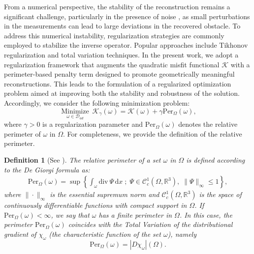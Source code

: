 \documentclass[a4paper,12pt,reqno,natbib]{amsart}
\newtheorem{definition}[theorem]{Definition}
\newcommand{\dx} {\displaystyle\mathrm{d}x}
\begin{document}
From a numerical perspective, the stability of the reconstruction remains a significant challenge, particularly in the presence of noise \cite{hadamard1923lectures}, as small perturbations in the measurements can lead to large deviations in the recovered obstacle. To address this numerical instability, regularization strategies are commonly employed to stabilize the inverse operator. Popular approaches include Tikhonov regularization and total variation techniques. In the present work, we adopt a regularization framework that augments the quadratic misfit functional \( \mathcal{K} \) with a perimeter-based penalty term designed to promote geometrically meaningful reconstructions. This leads to the formulation of a regularized optimization problem aimed at improving both the stability and robustness of the solution. Accordingly, we consider the following minimization problem:
\begin{equation}\label{regularization-topopt-problem}
    \displaystyle\operatorname*{Minimize}_{\omega\in\mathcal{D}_{ad}}\
\mathcal{K}_\gamma(\omega) = \mathcal{K}(\omega)+\gamma\text{Per}_\Omega(\omega),
\end{equation}
where $\gamma>0$ is a regularization parameter and $\text{Per}_\Omega(\omega)$ denotes the relative perimeter of $\omega$ in $\Omega.$ For completeness, we provide the definition of the relative perimeter.




\begin{definition}[See \cite{HenrotBook2005}]
    The relative perimeter of a set $\omega$ in $\Omega$ is defined according to the De Giorgi formula as:
    \begin{align}
\text{Per}_\Omega(\omega)=\sup\left\{\int_{\omega}\text{div}\
\Psi\,\dx\; ; \; \Psi\in \mathcal{C}^1_c(\Omega,\mathbb{R}^3),\;\|\Psi\|_{\infty}\leq1\right\},
\end{align}
where $\|\cdot\|_{\infty}$ is the essential supremum norm and $\mathcal{C}^1_c(\Omega,\mathbb{R}^3)$ is the space of continuously differentiable functions with compact support in $\Omega$. If $\text{Per}_\Omega(\omega)<\infty$, we say that $\omega$  has a finite perimeter in
$\Omega$. In this case, the perimeter $\text{Per}_\Omega(\omega)$ coincides with the Total Variation of the distributional gradient of $\chi_{\omega}$ (the characteristic function of the set $\omega$), namely
\begin{equation}
\text{Per}_\Omega(\omega)=|D\chi_{\omega}|(\Omega).
\end{equation}
\end{definition}
\end{document}
